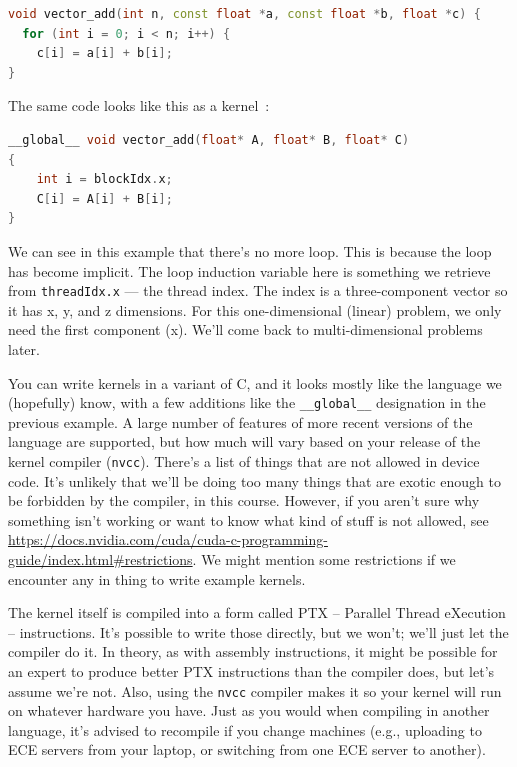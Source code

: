 \documentclass[a4paper]{report}
\newcommand{\CPP}{C\nolinebreak\hspace{-.05em}\raisebox{.4ex}{\tiny\bf +}\nolinebreak\hspace{-.10em}\raisebox{.4ex}{\tiny\bf +}}
\def\CPP{{C\nolinebreak[4]\hspace{-.05em}\raisebox{.4ex}{\tiny\bf ++}}}
\begin{document}
\begin{lstlisting}[language=C++]
void vector_add(int n, const float *a, const float *b, float *c) {
  for (int i = 0; i < n; i++) {
    c[i] = a[i] + b[i];
}
\end{lstlisting}


The same code looks like this as a kernel~\cite{cuda}:
\begin{lstlisting}[language=C++]
__global__ void vector_add(float* A, float* B, float* C)
{
    int i = blockIdx.x;
    C[i] = A[i] + B[i];
}
\end{lstlisting}

We can see in this example that there's no more loop. This is because the loop has become implicit. The loop induction variable here is something we retrieve from \texttt{threadIdx.x} --- the thread index. The index is a three-component vector so it has x, y, and z dimensions. For this one-dimensional (linear) problem, we only need the first component (x). We'll come back to multi-dimensional problems later.

You can write kernels in a variant of \CPP, and it looks mostly like the language we (hopefully) know, with a few additions like the \texttt{\_\_global\_\_} designation in the previous example. A large number of features of more recent versions of the language are supported, but how much will vary based on your release of the kernel compiler (\texttt{nvcc}). There's a list of things that are not allowed in device code. It's unlikely that we'll be doing too many things that are exotic enough to be forbidden by the compiler, in this course. However, if you aren't sure why something isn't working or want to know what kind of stuff is not allowed, see \url{https://docs.nvidia.com/cuda/cuda-c-programming-guide/index.html#restrictions}. We might mention some restrictions if we encounter any in thing to write example kernels.

The kernel itself is compiled into a form called PTX -- Parallel Thread eXecution -- instructions. It's possible to write those directly, but we won't; we'll just let the compiler do it. In theory, as with assembly instructions, it might be possible for an expert to produce better PTX instructions than the compiler does, but let's assume we're not. Also, using the \texttt{nvcc} compiler makes it so your kernel will run on whatever hardware you have. Just as you would when compiling in another language, it's advised to recompile if you change machines (e.g., uploading to ECE servers from your laptop, or switching from one ECE server to another).
\end{document}
